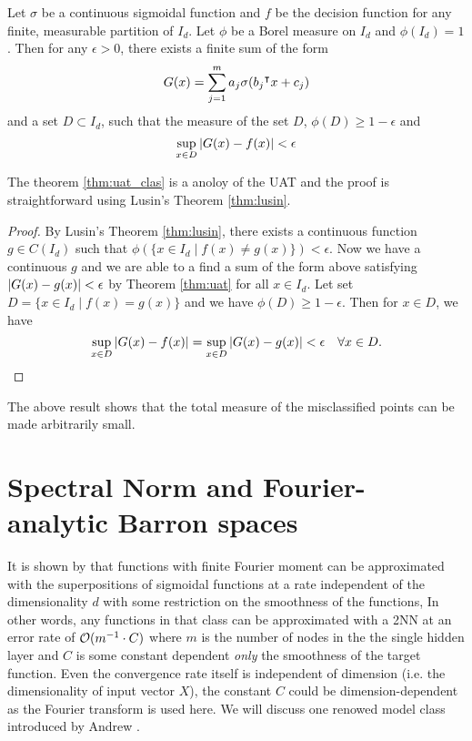 \begin{theorem}
    \label{thm:uat_clas}
    Let $\sigma$ be a continuous sigmoidal function and $f$ be the decision
    function for any finite, measurable partition of $I_d$. Let $\phi$ be a
    Borel measure on $I_d$ and $\phi(I_d) = 1$. Then for any $\epsilon>0$, there
    exists a finite sum of the form
    \begin{equation}
        G(x) = \sum_{j=1}^{m} a_j \sigma(b_j{}^{\intercal} x + c_j)
    \end{equation}
    and a set $D\subset I_d$, such that the measure of the set $D$, $\phi(D) \geq 1 - \epsilon$ and
    \begin{equation}
        \sup_{x\in D}\left| G(x) - f(x) \right| < \epsilon
    \end{equation}
\end{theorem}

The theorem \eqref{thm:uat_clas} is a anoloy of the UAT and the proof is
straightforward using Lusin's Theorem \eqref{thm:lusin}.

\begin{proof}
    By Lusin's Theorem \eqref{thm:lusin}, there exists a continuous function $g
    \in C(I_d)$ such that $\phi(\{x\in I_d \mid f(x) \not= g(x)\}) < \epsilon$.
    Now we have a continuous $g$ and we are able to a find a sum of the form
    above satisfying $\left| G(x) - g(x) \right| < \epsilon$ by Theorem \eqref{thm:uat}
    for all $x\in I_d$. Let set $D = \{x\in I_d \mid f(x) = g(x)\}$ and we have
    $\phi(D) \geq 1 - \epsilon$. Then for $x\in D$, we have
    \begin{equation}
        \sup_{x\in D}\left| G(x)-f(x) \right| = \sup_{x\in D}\left| G(x) - g(x) \right| < \epsilon 
        \quad \forall x\in D.
    \end{equation}
\end{proof}

The above result shows that the total measure of the misclassified points can be made arbitrarily small.


\section{Spectral Norm and Fourier-analytic Barron spaces}
\label{sec:spectral_norm}

It is shown by \cite{barronUniversalApproximationBounds1993} that functions with
finite Fourier moment can be approximated with the superpositions of sigmoidal
functions at a rate independent of the dimensionality $d$ with some restriction
on the smoothness of the functions, In other words, any functions in that class
can be approximated with a 2NN at an error rate of $\mathcal{O}(m^{-1} \cdot C)$ where
$m$ is the number of nodes in the the single hidden layer and $C$ is some
constant dependent \textit{only} the smoothness of the target function. Even the
convergence rate itself is independent of dimension (i.e. the dimensionality of
input vector $X$), the constant $C$ could be dimension-dependent as the Fourier
transform is used here. We will discuss one renowed model class introduced by
Andrew \cite{barronUniversalApproximationBounds1993}.

